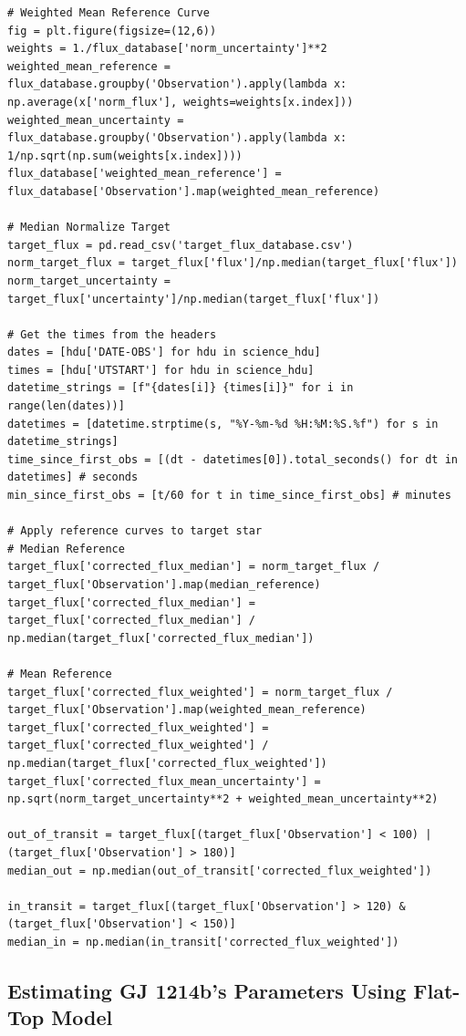 \documentclass{article}
\begin{document}
\begin{appendices}
\begin{scriptsize}
\begin{verbatim}
# Weighted Mean Reference Curve
fig = plt.figure(figsize=(12,6))
weights = 1./flux_database['norm_uncertainty']**2
weighted_mean_reference = flux_database.groupby('Observation').apply(lambda x: np.average(x['norm_flux'], weights=weights[x.index]))
weighted_mean_uncertainty = flux_database.groupby('Observation').apply(lambda x: 1/np.sqrt(np.sum(weights[x.index])))
flux_database['weighted_mean_reference'] = flux_database['Observation'].map(weighted_mean_reference)

# Median Normalize Target
target_flux = pd.read_csv('target_flux_database.csv')
norm_target_flux = target_flux['flux']/np.median(target_flux['flux'])
norm_target_uncertainty = target_flux['uncertainty']/np.median(target_flux['flux'])

# Get the times from the headers
dates = [hdu['DATE-OBS'] for hdu in science_hdu]
times = [hdu['UTSTART'] for hdu in science_hdu]
datetime_strings = [f"{dates[i]} {times[i]}" for i in range(len(dates))]
datetimes = [datetime.strptime(s, "%Y-%m-%d %H:%M:%S.%f") for s in datetime_strings]
time_since_first_obs = [(dt - datetimes[0]).total_seconds() for dt in datetimes] # seconds
min_since_first_obs = [t/60 for t in time_since_first_obs] # minutes

# Apply reference curves to target star
# Median Reference
target_flux['corrected_flux_median'] = norm_target_flux / target_flux['Observation'].map(median_reference)
target_flux['corrected_flux_median'] = target_flux['corrected_flux_median'] / np.median(target_flux['corrected_flux_median'])

# Mean Reference
target_flux['corrected_flux_weighted'] = norm_target_flux / target_flux['Observation'].map(weighted_mean_reference)
target_flux['corrected_flux_weighted'] = target_flux['corrected_flux_weighted'] / np.median(target_flux['corrected_flux_weighted'])
target_flux['corrected_flux_mean_uncertainty'] = np.sqrt(norm_target_uncertainty**2 + weighted_mean_uncertainty**2)

out_of_transit = target_flux[(target_flux['Observation'] < 100) | (target_flux['Observation'] > 180)]
median_out = np.median(out_of_transit['corrected_flux_weighted'])

in_transit = target_flux[(target_flux['Observation'] > 120) & (target_flux['Observation'] < 150)]
median_in = np.median(in_transit['corrected_flux_weighted'])
\end{verbatim}
\end{scriptsize}

\subsection{Estimating GJ 1214b's Parameters Using Flat-Top Model}
\begin{scriptsize}
\begin{verbatim}



\end{verbatim}
\end{scriptsize}
\end{appendices}
\end{document}
